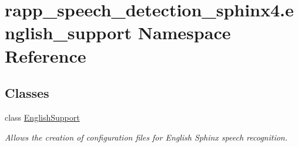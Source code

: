 \hypertarget{namespacerapp__speech__detection__sphinx4_1_1english__support}{\section{rapp\-\_\-speech\-\_\-detection\-\_\-sphinx4.\-english\-\_\-support Namespace Reference}
\label{namespacerapp__speech__detection__sphinx4_1_1english__support}
}
\subsection*{Classes}
\begin{DoxyCompactItemize}
\item 
class \hyperlink{classrapp__speech__detection__sphinx4_1_1english__support_1_1EnglishSupport}{English\-Support}
\begin{DoxyCompactList}\small\item\em Allows the creation of configuration files for English Sphinx speech recognition. \end{DoxyCompactList}\end{DoxyCompactItemize}
